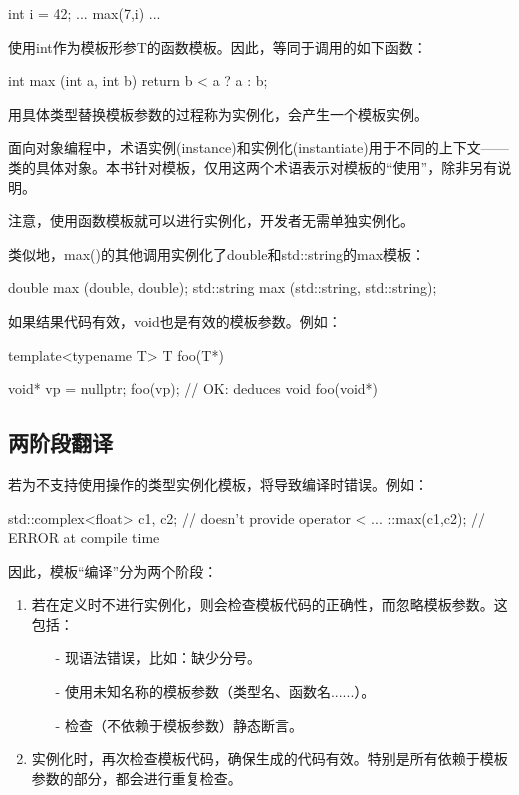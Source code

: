 \begin{cpp}
int i = 42;
... max(7,i) ...
\end{cpp}

使用int作为模板形参T的函数模板。因此，等同于调用的如下函数：

\begin{cpp}
int max (int a, int b) {
	return b < a ? a : b;
}
\end{cpp}

用具体类型替换模板参数的过程称为实例化，会产生一个模板实例。

\begin{notice}
面向对象编程中，术语实例(instance)和实例化(instantiate)用于不同的上下文——类的具体对象。本书针对模板，仅用这两个术语表示对模板的“使用”，除非另有说明。
\end{notice}

注意，使用函数模板就可以进行实例化，开发者无需单独实例化。

类似地，max()的其他调用实例化了double和std::string的max模板：

\begin{cpp}
double max (double, double);
std::string max (std::string, std::string);
\end{cpp}

如果结果代码有效，void也是有效的模板参数。例如：

\begin{cpp}
template<typename T>
T foo(T*) {}

void* vp = nullptr;
foo(vp); // OK: deduces void foo(void*)
\end{cpp}

\subsection{两阶段翻译}

若为不支持使用操作的类型实例化模板，将导致编译时错误。例如：

\begin{cpp}
std::complex<float> c1, c2; // doesn't provide operator <
...
::max(c1,c2); // ERROR at compile time
\end{cpp}

因此，模板“编译”分为两个阶段：

\begin{enumerate}
\item 
若在定义时不进行实例化，则会检查模板代码的正确性，而忽略模板参数。这包括：
\begin{itemize}
\item[-] 
现语法错误，比如：缺少分号。

\item[-]
使用未知名称的模板参数（类型名、函数名......）。

\item[-]
检查（不依赖于模板参数）静态断言。
\end{itemize}

\item 
实例化时，再次检查模板代码，确保生成的代码有效。特别是所有依赖于模板参数的部分，都会进行重复检查。
\end{enumerate}

